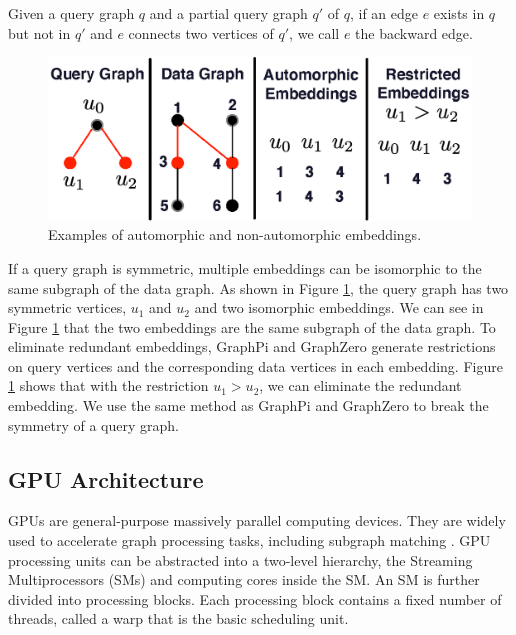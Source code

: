 
 Given a query graph $q$ and a partial query graph $q'$ of $q$, if an edge $e$ exists in $q$ but not in $q'$ and
$e$ connects two vertices of $q'$, we call $e$ the backward edge.

\begin{figure}
\centering
\includegraphics[width=\columnwidth]{./figure/automorphism.eps}
\caption{Examples of automorphic and non-automorphic embeddings.}	
\label{fig:automo}
\end{figure}

If a query graph is symmetric, multiple embeddings can be isomorphic to the same subgraph of the data graph. As shown in Figure
\ref{fig:automo}, the query graph has two symmetric vertices, $u_1$ and $u_2$ and two isomorphic embeddings. We can see in Figure
\ref{fig:automo} that the two embeddings are the same subgraph of the data graph. To eliminate redundant embeddings, GraphPi
\cite{shi2020graphpi} and GraphZero \cite{mawhirter2019graphzero} generate restrictions on query vertices and the corresponding data
vertices in each embedding. Figure \ref{fig:automo} shows that with the restriction $u_1 > u_2$, we can eliminate the redundant embedding.
We use the same method as GraphPi and GraphZero to break the symmetry of a query graph.

\subsection{GPU Architecture}
GPUs are general-purpose massively parallel computing devices. They are widely used to accelerate graph processing tasks, including
subgraph matching \FIXME{\cite{}}. GPU processing units can be abstracted into a two-level hierarchy, the Streaming Multiprocessors (SMs)
and computing cores inside the SM. An SM is further divided into processing blocks. Each processing block contains a fixed number of
threads, called a warp that is the basic scheduling unit.

